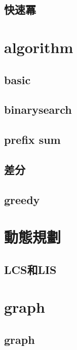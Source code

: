         \subsection{快速冪}
            

\section{algorithm}
    \subsection{basic}
        
    \subsection{binarysearch}
        
    \subsection{prefix sum}
        
    \subsection{差分}
        
    \subsection{greedy}
        

        
\section{動態規劃}
    \subsection{LCS和LIS}
        



\section{graph}
    \subsection{graph}
        



